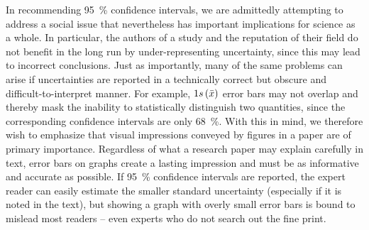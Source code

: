 In recommending 95~\% confidence intervals, we are admittedly attempting to address a social issue that nevertheless has important implications for science as a whole. In particular, the authors of a study and the reputation of their field do not benefit in the long run by under-representing uncertainty, since this may lead to incorrect conclusions. Just as importantly, many of the same problems can arise if uncertainties are reported in a technically correct but obscure and difficult-to-interpret manner. For example, $1s\left( \bar{x} \right)$ error bars may not overlap and thereby mask the inability to statistically distinguish two quantities, since the corresponding confidence intervals are only 68~\%. With this in mind, we therefore wish to emphasize that visual impressions conveyed by figures in a paper are of primary importance. Regardless of what a research paper may explain carefully in text, error bars on graphs create a lasting impression and must be as informative and accurate as possible. If 95~\% confidence intervals are reported, the expert reader can easily estimate the smaller standard uncertainty (especially if it is noted in the text), but showing a graph with overly small error bars is bound to mislead most readers -- even experts who do not search out the fine print.









